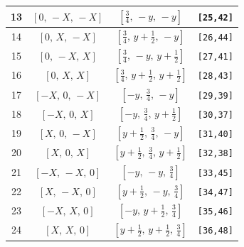 \documentclass[fleqn,8pt]{jsarticle}
\begin{document}
\begin{longtable}{cccc}
13 & $\left[ 0,\, - X,\, - X \right]$ & $\left[ \frac{3}{4},\, - y,\, - y \right]$ & {\tt [25,42]} \\ \hline
14 & $\left[ 0,\, X,\, - X \right]$ & $\left[ \frac{3}{4},\, y + \frac{1}{2},\, - y \right]$ & {\tt [26,44]} \\ \hline
15 & $\left[ 0,\, - X,\, X \right]$ & $\left[ \frac{3}{4},\, - y,\, y + \frac{1}{2} \right]$ & {\tt [27,41]} \\ \hline
16 & $\left[ 0,\, X,\, X \right]$ & $\left[ \frac{3}{4},\, y + \frac{1}{2},\, y + \frac{1}{2} \right]$ & {\tt [28,43]} \\ \hline
17 & $\left[ - X,\, 0,\, - X \right]$ & $\left[ - y,\, \frac{3}{4},\, - y \right]$ & {\tt [29,39]} \\ \hline
18 & $\left[ - X,\, 0,\, X \right]$ & $\left[ - y,\, \frac{3}{4},\, y + \frac{1}{2} \right]$ & {\tt [30,37]} \\ \hline
19 & $\left[ X,\, 0,\, - X \right]$ & $\left[ y + \frac{1}{2},\, \frac{3}{4},\, - y \right]$ & {\tt [31,40]} \\ \hline
20 & $\left[ X,\, 0,\, X \right]$ & $\left[ y + \frac{1}{2},\, \frac{3}{4},\, y + \frac{1}{2} \right]$ & {\tt [32,38]} \\ \hline
21 & $\left[ - X,\, - X,\, 0 \right]$ & $\left[ - y,\, - y,\, \frac{3}{4} \right]$ & {\tt [33,45]} \\ \hline
22 & $\left[ X,\, - X,\, 0 \right]$ & $\left[ y + \frac{1}{2},\, - y,\, \frac{3}{4} \right]$ & {\tt [34,47]} \\ \hline
23 & $\left[ - X,\, X,\, 0 \right]$ & $\left[ - y,\, y + \frac{1}{2},\, \frac{3}{4} \right]$ & {\tt [35,46]} \\ \hline
24 & $\left[ X,\, X,\, 0 \right]$ & $\left[ y + \frac{1}{2},\, y + \frac{1}{2},\, \frac{3}{4} \right]$ & {\tt [36,48]} \\
\end{longtable}
\renewcommand{\arraystretch}{1.2}
\end{document}
